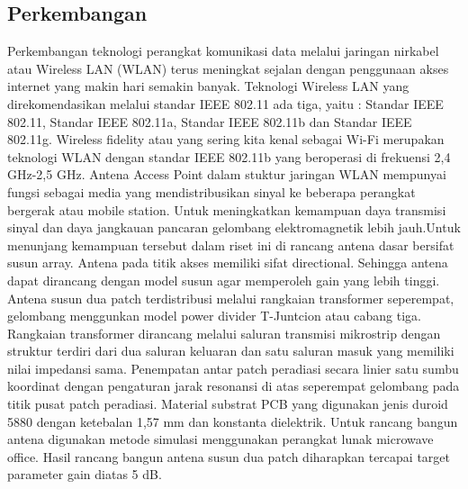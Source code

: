 \subsection {Perkembangan}
Perkembangan teknologi perangkat komunikasi data melalui jaringan nirkabel atau Wireless LAN (WLAN) terus meningkat sejalan dengan 
penggunaan akses internet yang makin hari semakin banyak. Teknologi Wireless LAN yang direkomendasikan melalui standar IEEE 802.11 
ada tiga, yaitu : Standar IEEE 802.11, Standar IEEE 802.11a, 
Standar IEEE 802.11b dan Standar IEEE 802.11g. Wireless fidelity atau yang sering 
kita kenal sebagai Wi-Fi merupakan teknologi WLAN dengan standar IEEE 802.11b yang beroperasi di frekuensi 2,4 GHz-2,5 GHz. Antena Access 
Point dalam stuktur jaringan WLAN mempunyai fungsi sebagai media yang mendistribusikan sinyal ke beberapa perangkat bergerak atau mobile 
station. Untuk meningkatkan kemampuan daya transmisi sinyal dan daya jangkauan pancaran gelombang elektromagnetik lebih jauh.Untuk 
menunjang kemampuan tersebut dalam riset ini di rancang antena dasar bersifat susun array. Antena pada titik akses memiliki sifat 
directional. Sehingga antena dapat dirancang dengan model susun agar memperoleh gain yang lebih tinggi. Antena susun dua patch 
terdistribusi melalui rangkaian transformer seperempat, gelombang menggunkan model power divider T-Juntcion atau cabang tiga. Rangkaian transformer 
dirancang melalui saluran transmisi mikrostrip dengan struktur terdiri dari dua saluran keluaran dan satu saluran masuk yang memiliki 
nilai impedansi sama. Penempatan antar patch peradiasi secara linier satu sumbu koordinat dengan pengaturan jarak resonansi di atas 
seperempat gelombang pada titik pusat patch peradiasi. Material substrat PCB yang digunakan jenis duroid 5880 dengan ketebalan 1,57 mm dan
 konstanta dielektrik. Untuk rancang bangun antena digunakan metode simulasi menggunakan perangkat lunak microwave office. Hasil 
 rancang bangun antena susun dua patch diharapkan tercapai target parameter gain diatas 5 dB.
 
 \cite {yustiyan2006analisa}
 \cite {arief2007teknologi}
 \cite {darsono2012rancang}
 \cite {yudianto2007jaringan}